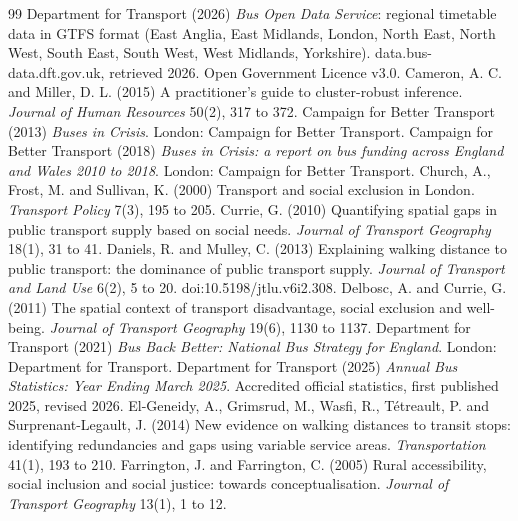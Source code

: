 \documentclass[11pt,a4paper]{article}
\begin{document}
\begin{thebibliography}{99}
 Department for Transport (2026) \textit{Bus Open Data Service}: regional timetable data in GTFS format (East Anglia, East Midlands, London, North East, North West, South East, South West, West Midlands, Yorkshire). data.bus-data.dft.gov.uk, retrieved 2026. Open Government Licence v3.0.
 Cameron, A. C. and Miller, D. L. (2015) A practitioner's guide to cluster-robust inference. \textit{Journal of Human Resources} 50(2), 317 to 372.
 Campaign for Better Transport (2013) \textit{Buses in Crisis}. London: Campaign for Better Transport.
 Campaign for Better Transport (2018) \textit{Buses in Crisis: a report on bus funding across England and Wales 2010 to 2018}. London: Campaign for Better Transport.
 Church, A., Frost, M. and Sullivan, K. (2000) Transport and social exclusion in London. \textit{Transport Policy} 7(3), 195 to 205.
 Currie, G. (2010) Quantifying spatial gaps in public transport supply based on social needs. \textit{Journal of Transport Geography} 18(1), 31 to 41.
 Daniels, R. and Mulley, C. (2013) Explaining walking distance to public transport: the dominance of public transport supply. \textit{Journal of Transport and Land Use} 6(2), 5 to 20. doi:10.5198/jtlu.v6i2.308.
 Delbosc, A. and Currie, G. (2011) The spatial context of transport disadvantage, social exclusion and well-being. \textit{Journal of Transport Geography} 19(6), 1130 to 1137.
 Department for Transport (2021) \textit{Bus Back Better: National Bus Strategy for England}. London: Department for Transport.
 Department for Transport (2025) \textit{Annual Bus Statistics: Year Ending March 2025}. Accredited official statistics, first published 2025, revised 2026.
 El-Geneidy, A., Grimsrud, M., Wasfi, R., T\'etreault, P. and Surprenant-Legault, J. (2014) New evidence on walking distances to transit stops: identifying redundancies and gaps using variable service areas. \textit{Transportation} 41(1), 193 to 210.
 Farrington, J. and Farrington, C. (2005) Rural accessibility, social inclusion and social justice: towards conceptualisation. \textit{Journal of Transport Geography} 13(1), 1 to 12.

\end{thebibliography}
\end{document}
